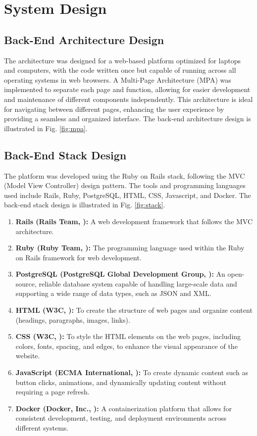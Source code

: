 \section{System Design}
    \subsection{Back-End Architecture Design}
    The architecture was designed for a web-based platform optimized for laptops and computers, with the code written once but capable of running across all operating systems in web browsers. A Multi-Page Architecture (MPA) was implemented to separate each page and function, allowing for easier development and maintenance of different components independently. This architecture is ideal for navigating between different pages, enhancing the user experience by providing a seamless and organized interface. The back-end architecture design is illustrated in Fig. \ref{fig:mpa}.
    \subsection{Back-End Stack Design}
        The platform was developed using the Ruby on Rails stack, following the MVC (Model View Controller) design pattern. The tools and programming languages used include Rails, Ruby, PostgreSQL, HTML, CSS, Javascript, and Docker. The back-end stack design is illustrated in Fig. \ref{fig:stack}.
        \begin{enumerate}
            \item \textbf{Rails (Rails Team, \citeyear{rails2024}):} A web development framework that follows the MVC architecture. 
            \item \textbf{Ruby (Ruby Team, \citeyear{ruby2024}):} The programming language used within the Ruby on Rails framework for web development.
            \item \textbf{PostgreSQL (PostgreSQL Global Development Group, \citeyear{postgresql2024}):} An open-source, reliable database system capable of handling large-scale data and supporting a wide range of data types, such as JSON and XML.
            \item \textbf{HTML (W3C, \citeyear{html2024}):} To create the structure of web pages and organize content (headings, paragraphs, images, links).
            \item \textbf{CSS (W3C, \citeyear{css2024}):} To style the HTML elements on the web pages, including colors, fonts, spacing, and edges, to enhance the visual appearance of the website.
            \item \textbf{JavaScript (ECMA International, \citeyear{javascript2024}):} To create dynamic content such as button clicks, animations, and dynamically updating content without requiring a page refresh.
            \item \textbf{Docker (Docker, Inc., \citeyear{docker2024}):} A containerization platform that allows for consistent development, testing, and deployment environments across different systems. \newline
        \end{enumerate} 
        
